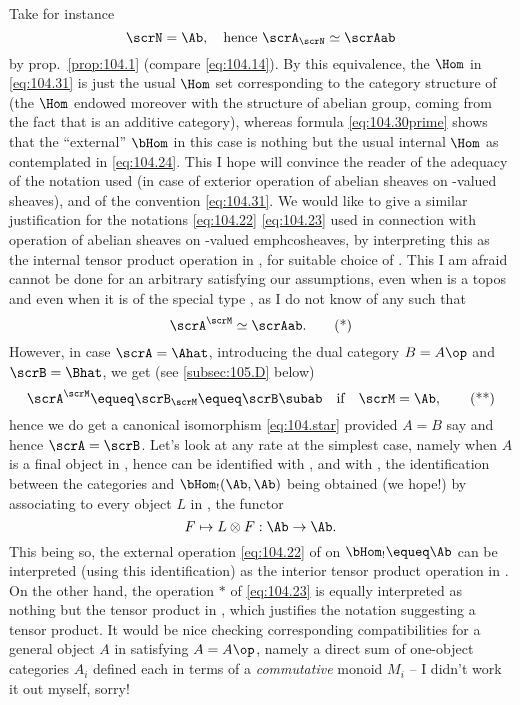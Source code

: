 \begin{comments}
  Take for instance
  \[\scrN=\Ab,\quad\text{hence $\scrA_\scrN\simeq\scrAab$}\]
  by prop.\ \ref{prop:104.1} (compare \eqref{eq:104.14}). By this
  equivalence, the $\Hom$ in \eqref{eq:104.31} is just the usual
  $\Hom$ set corresponding to the category structure of \scrAab{} (the
  $\Hom$ endowed moreover with the structure of abelian group, coming
  from the fact that \scrAab{} is an additive category), whereas
  formula \eqref{eq:104.30prime} shows that the ``external'' $\bHom$
  in this case is nothing but the usual internal $\Hom$ as
  contemplated in \eqref{eq:104.24}. This I hope will convince the
  reader of the adequacy of the notation used (in case of exterior
  operation of abelian sheaves on \scrN-valued sheaves), and of the
  convention \eqref{eq:104.31}. We would like to give a similar
  justification for the notations \eqref{eq:104.22} \eqref{eq:104.23}
  used in connection with operation of abelian sheaves on \scrM-valued
  emph{co}sheaves, by interpreting this as the internal tensor product
  operation in \scrAab, for suitable choice of \scrN. This I am afraid
  cannot be done for an arbitrary \scrA{} satisfying our
  assumptions, even when \scrA{} is a topos and even when it is of the
  special type \Ahat, as I do not know of any \scrM{} such that
  \begin{equation}
    \label{eq:104.star}
    \scrA^\scrM\simeq\scrAab.\tag{*}
  \end{equation}
  However, in case $\scrA=\Ahat$, introducing the dual category
  $B=A\op$ and $\scrB=\Bhat$, we get (see \ref{subsec:105.D} below)
  \begin{equation}
    \label{eq:104.starstar}
    \scrA^\scrM \equeq \scrB_\scrM \equeq
    \scrB\subab\quad\text{if}\quad \scrM=\Ab,\tag{**}
  \end{equation}
  hence we do get a canonical isomorphism \eqref{eq:104.star} provided
  $A=B$ say and hence $\scrA=\scrB$. Let's look at any rate at the
  simplest case, namely when $A$ is a final object in \Cat, hence
  \scrA{} can be identified with \Sets, and \scrAab{} with \Ab, the
  identification between the categories \Ab{} and $\bHom_!(\Ab,\Ab)$
  being obtained (we hope!) by associating to every object $L$ in \Ab,
  the functor
  \[F\mapsto L\otimes F: \Ab\to\Ab.\]
  This being so, the external operation \eqref{eq:104.22} of \Ab{} on
  $\bHom_!\equeq\Ab$ can be interpreted (using this identification) as
  the interior tensor product operation in \Ab. On the other hand, the
  operation $*$ of \eqref{eq:104.23} is equally interpreted as nothing
  but the tensor product in \Ab, which justifies the notation
  suggesting a tensor product. It would be nice checking corresponding
  compatibilities for a general object $A$ in \Cat{} satisfying
  $A=A\op$, namely a direct sum of one-object categories $A_i$ defined
  each in terms of a \emph{commutative} monoid $M_i$ -- I didn't work
  it out myself, sorry!


\end{comments}
